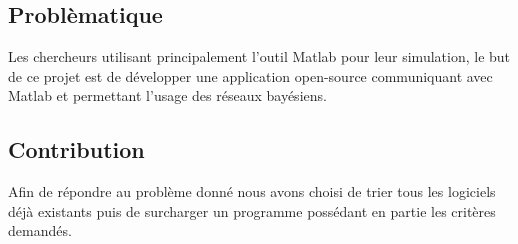 \documentclass[conference]{IEEEtran}
\begin{document}
\subsection{Problèmatique}
Les chercheurs utilisant principalement l'outil Matlab pour leur simulation, le but de ce projet est de développer une application open-source communiquant avec Matlab et permettant l'usage des réseaux bayésiens.

\subsection{Contribution}
Afin de répondre au problème donné nous avons choisi de trier tous les logiciels déjà existants puis de surcharger un programme possédant en partie les critères demandés.




\tableofcontents




%
%

\end{document}
